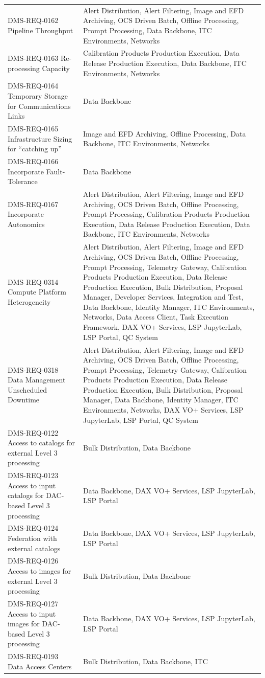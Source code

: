 \documentclass[DM,lsstdraft,toc]{lsstdoc}
\begin{document}
\begin{longtable}[]{@{}ll@{}}
DMS-REQ-0162 Pipeline Throughput & Alert Distribution, Alert Filtering,
Image and EFD Archiving, OCS Driven Batch, Offline Processing, Prompt
Processing, Data Backbone, ITC Environments, Networks\tabularnewline
DMS-REQ-0163 Re-processing Capacity & Calibration Products Production
Execution, Data Release Production Execution, Data Backbone, ITC
Environments, Networks\tabularnewline
DMS-REQ-0164 Temporary Storage for Communications Links & Data
Backbone\tabularnewline
DMS-REQ-0165 Infrastructure Sizing for ``catching up'' & Image and EFD
Archiving, Offline Processing, Data Backbone, ITC Environments,
Networks\tabularnewline
DMS-REQ-0166 Incorporate Fault-Tolerance & Data Backbone\tabularnewline
DMS-REQ-0167 Incorporate Autonomics & Alert Distribution, Alert
Filtering, Image and EFD Archiving, OCS Driven Batch, Offline
Processing, Prompt Processing, Calibration Products Production
Execution, Data Release Production Execution, Data Backbone, ITC
Environments, Networks\tabularnewline
DMS-REQ-0314 Compute Platform Heterogeneity & Alert Distribution, Alert
Filtering, Image and EFD Archiving, OCS Driven Batch, Offline
Processing, Prompt Processing, Telemetry Gateway, Calibration Products
Production Execution, Data Release Production Execution, Bulk
Distribution, Proposal Manager, Developer Services, Integration and
Test, Data Backbone, Identity Manager, ITC Environments, Networks, Data
Access Client, Task Execution Framework, DAX VO+ Services, LSP
JupyterLab, LSP Portal, QC System\tabularnewline
DMS-REQ-0318 Data Management Unscheduled Downtime & Alert Distribution,
Alert Filtering, Image and EFD Archiving, OCS Driven Batch, Offline
Processing, Prompt Processing, Telemetry Gateway, Calibration Products
Production Execution, Data Release Production Execution, Bulk
Distribution, Proposal Manager, Data Backbone, Identity Manager, ITC
Environments, Networks, DAX VO+ Services, LSP JupyterLab, LSP Portal, QC
System\tabularnewline
DMS-REQ-0122 Access to catalogs for external Level 3 processing & Bulk
Distribution, Data Backbone\tabularnewline
DMS-REQ-0123 Access to input catalogs for DAC-based Level 3 processing &
Data Backbone, DAX VO+ Services, LSP JupyterLab, LSP
Portal\tabularnewline
DMS-REQ-0124 Federation with external catalogs & Data Backbone, DAX VO+
Services, LSP JupyterLab, LSP Portal\tabularnewline
DMS-REQ-0126 Access to images for external Level 3 processing & Bulk
Distribution, Data Backbone\tabularnewline
DMS-REQ-0127 Access to input images for DAC-based Level 3 processing &
Data Backbone, DAX VO+ Services, LSP JupyterLab, LSP
Portal\tabularnewline
DMS-REQ-0193 Data Access Centers & Bulk Distribution, Data Backbone, ITC

\end{longtable}
\end{document}
